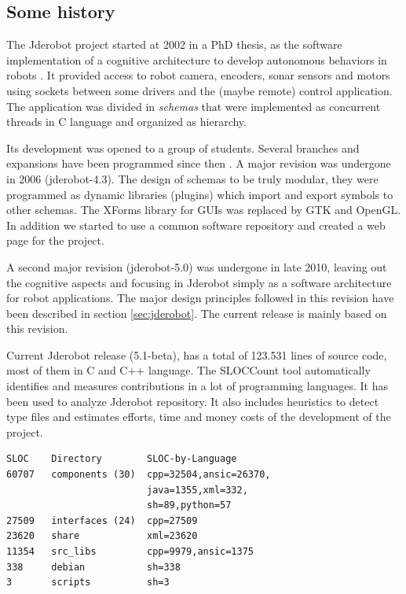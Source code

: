 \documentclass[twocolumn]{svjour3}          %
\begin{document}
\subsection{Some history}

The Jderobot project started at 2002 in a PhD thesis, as the software implementation of a cognitive architecture to develop autonomous behaviors in robots \cite{canas02,canas05e}. It provided access to robot camera, encoders, sonar sensors and motors using sockets between some drivers and the (maybe remote) control application. The application was divided in \textit{schemas} that were implemented as concurrent threads in C language and organized as hierarchy. 

Its development was opened to a group of students. Several branches and expansions have been programmed since then \cite{canas07,canas07f}. A major revision was undergone in 2006 (jderobot-4.3). The design of schemas to be truly modular, they were programmed as dynamic libraries (plugins) which import and export symbols to other schemas. The XForms library for GUIs was replaced by GTK and OpenGL. In addition we started to use a common software repository and created a web page for the project. 

A second major revision (jderobot-5.0) was undergone in late 2010, leaving out the cognitive aspects and focusing in Jderobot simply as a software architecture for robot applications. The major design principles followed in this revision have been described in section \ref{sec:jderobot}. The current release is mainly based on this revision.

Current Jderobot release (5.1-beta), has a total of 123.531 lines of source code, most of them in C and C++ language. The SLOCCount tool automatically identifies and measures contributions in a lot of programming languages. It has been used to analyze Jderobot repository. It also includes heuristics to detect type files and estimates efforts, time and money costs of the development of the project.

\begin{verbatim}
SLOC    Directory        SLOC-by-Language 
60707   components (30)  cpp=32504,ansic=26370,
                         java=1355,xml=332,
                         sh=89,python=57
27509   interfaces (24)  cpp=27509
23620   share            xml=23620
11354   src_libs         cpp=9979,ansic=1375
338     debian           sh=338
3       scripts          sh=3
\end{verbatim}
\end{document}
